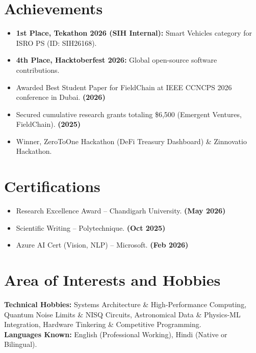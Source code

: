 \documentclass[9pt,a4paper]{extarticle}
\begin{document}
\section{Achievements}
\begin{itemize}
    \item \textbf{1st Place, Tekathon 2026 (SIH Internal):} Smart Vehicles category for ISRO PS (ID: SIH26168).
    \item \textbf{4th Place, Hacktoberfest 2026:} Global open-source software contributions.
    \item Awarded Best Student Paper for FieldChain at IEEE CCNCPS 2026 conference in Dubai. \hfill \textbf{(2026)}
    \item Secured cumulative research grants totaling \$6,500 (Emergent Ventures, FieldChain). \hfill \textbf{(2025)}
    \item Winner, ZeroToOne Hackathon (DeFi Treasury Dashboard) \& Zinnovatio Hackathon.
\end{itemize}

\section{Certifications}
\begin{itemize}
    \item Research Excellence Award -- Chandigarh University. \hfill \textbf{(May 2026)}
    \item Scientific Writing -- Polytechnique. \hfill \textbf{(Oct 2025)}
    \item Azure AI Cert (Vision, NLP) -- Microsoft. \hfill \textbf{(Feb 2026)}
\end{itemize}

\section{Area of Interests and Hobbies}
\textbf{Technical Hobbies:} Systems Architecture \& High-Performance Computing, Quantum Noise Limits \& NISQ Circuits, Astronomical Data \& Physics-ML Integration, Hardware Tinkering \& Competitive Programming. \\
\textbf{Languages Known:} English (Professional Working), Hindi (Native or Bilingual).
\end{document}
